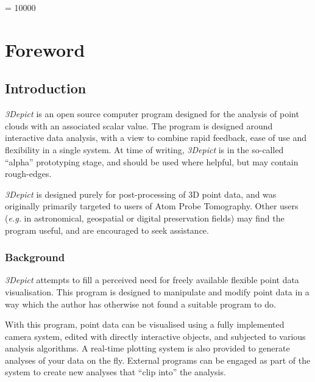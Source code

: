 \documentclass[10pt]{article}
\begin{document}
\widowpenalty = 10000



\section{Foreword}
\subsection{Introduction}

\emph{3Depict} is an open source computer program designed for the analysis of point clouds with an associated scalar value. The program is designed around interactive data analysis, with a view to combine rapid feedback, ease of use and flexibility in a single system.  At time of writing, \emph{3Depict} is in the so-called ``alpha'' prototyping stage, and should be used where helpful, but may contain rough-edges.

\emph{3Depict} is designed purely for post-processing of 3D point data, and was originally primarily targeted to users of Atom Probe Tomography. Other users (\emph{e.g.} in astronomical, geospatial or digital preservation fields) may find the program useful, and are encouraged to seek assistance. 
 
\subsubsection{Background}

\emph{3Depict} attempts to fill a perceived need for freely available flexible point data visualisation. This program is designed to manipulate and modify point data in a way which the author has otherwise not found a suitable program to do.  
 
With this program, point data can be visualised using a fully implemented camera system, edited with directly interactive objects, and subjected to various analysis algorithms. A real-time plotting system is also provided to generate analyses of your data on the fly. External programs can be engaged as part of the system to create new analyses that ``clip into'' the analysis. 
 
\end{document}
